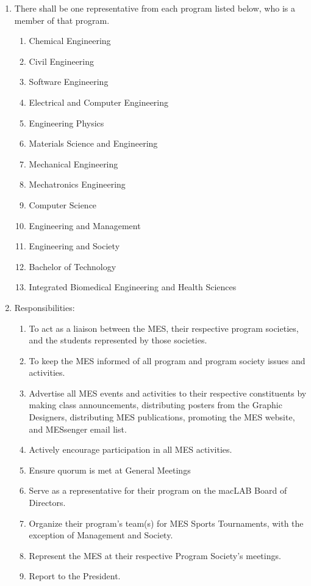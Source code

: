 \begin{enumerate}
 \item
  There shall be one representative from each program listed below, who
  is a member of that program.

  \begin{enumerate}
   \item
    Chemical Engineering
   \item
    Civil Engineering
   \item
    Software Engineering
   \item
    Electrical and Computer Engineering
   \item
    Engineering Physics
   \item
    Materials Science and Engineering
   \item
    Mechanical Engineering
   \item
    Mechatronics Engineering
   \item
    Computer Science
   \item
    Engineering and Management
   \item
    Engineering and Society
   \item
    Bachelor of Technology
   \item
    Integrated Biomedical Engineering and Health Sciences
  \end{enumerate}

 \item
  Responsibilities:

  \begin{enumerate}
   \item
    To act as a liaison between the MES, their respective program
    societies, and the students represented by those societies.
   \item
    To keep the MES informed of all program and program society issues
    and activities.
   \item
    Advertise all MES events and activities to their respective
    constituents by making class announcements, distributing posters
    from the Graphic Designers, distributing MES publications, promoting
    the MES website, and MESsenger email list.
   \item
    Actively encourage participation in all MES activities.
   \item
    Ensure quorum is met at General Meetings
   \item
    Serve as a representative for their program on the macLAB Board of
    Directors.
   \item
    Organize their program's team(s) for MES Sports Tournaments, with
    the exception of Management and Society.
   \item
    Represent the MES at their respective Program Society's meetings.
   \item
    Report to the President.
  \end{enumerate}

\end{enumerate}

